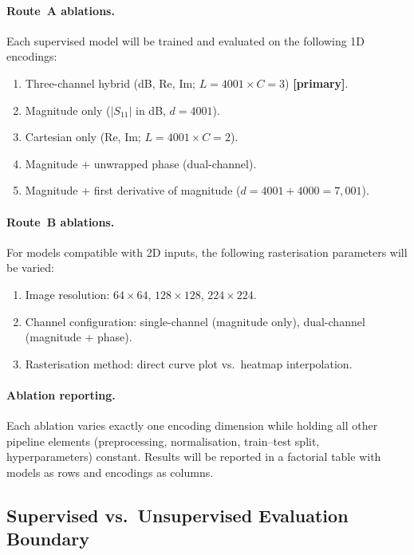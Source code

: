 \paragraph{Route~A ablations.}
Each supervised model will be trained and evaluated on the following
1D encodings:
%
\begin{enumerate}
  \item Three-channel hybrid (dB, Re, Im; $L = 4001 \times C = 3$)
        \textbf{[primary]}.
  \item Magnitude only ($|S_{11}|$ in dB, $d = 4001$).
  \item Cartesian only (Re, Im; $L = 4001 \times C = 2$).
  \item Magnitude + unwrapped phase (dual-channel).
  \item Magnitude + first derivative of magnitude
        ($d = 4001 + 4000 = 7{,}001$).
\end{enumerate}

\paragraph{Route~B ablations.}
For models compatible with 2D inputs, the following rasterisation
parameters will be varied:
%
\begin{enumerate}
  \item Image resolution: $64 \times 64$, $128 \times 128$,
        $224 \times 224$.
  \item Channel configuration: single-channel (magnitude only),
        dual-channel (magnitude + phase).
  \item Rasterisation method: direct curve plot vs.\ heatmap
        interpolation.
\end{enumerate}

\paragraph{Ablation reporting.}
Each ablation varies exactly one encoding dimension while holding all
other pipeline elements (preprocessing, normalisation, train--test
split, hyperparameters) constant.  Results will be reported in a
factorial table with models as rows and encodings as columns.


\subsection{Supervised vs.\ Unsupervised Evaluation Boundary}
\label{subsec:sup_vs_unsup}

